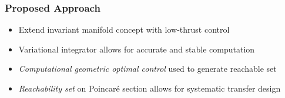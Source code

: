 %	

\begin{frame} %
\frametitle{Proposed Approach}
		\begin{itemize}
			\item Extend invariant manifold concept with low-thrust control  
			\item Variational integrator allows for accurate and stable computation
			\item \emph{Computational geometric optimal control} used to generate reachable set
			\item \emph{Reachability set} on Poincar\'e section allows for systematic transfer design
		\end{itemize}
\end{frame} %
